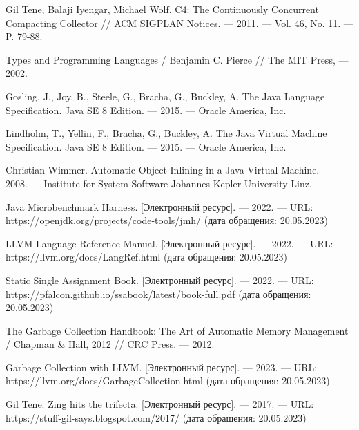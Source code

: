 \begingroup 
\renewcommand{\section}[2]{\anonsection{СПИСОК ИСПОЛЬЗОВАННЫХ ИСТОЧНИКОВ И ЛИТЕРАТУРЫ}}
\begin{flushleft}
\begin{thebibliography}{}

Gil Tene, Balaji Iyengar, Michael Wolf. C4: The Continuously Concurrent Compacting Collector
  // ACM SIGPLAN Notices. --- 2011. --- Vol. 46, No. 11. --- P. 79-88.

Types and Programming Languages / Benjamin C. Pierce // The MIT Press, --- 2002.

Gosling, J., Joy, B., Steele, G., Bracha, G., Buckley, A. The Java Language
Specification. Java SE 8 Edition. --- 2015. --- Oracle America, Inc.

Lindholm, T., Yellin, F., Bracha, G., Buckley, A. The Java Virtual Machine
Specification. Java SE 8 Edition. --- 2015. --- Oracle America, Inc.
	
Christian Wimmer. Automatic Object Inlining in a Java Virtual Machine. --- 2008. --- Institute for System Software
Johannes Kepler University Linz.

Java Microbenchmark Harness. [Электронный ресурс]. --- 2022. --- URL: https://openjdk.org/projects/code-tools/jmh/ (дата обращения: 20.05.2023)
	
LLVM Language Reference Manual. [Электронный ресурс]. --- 2022. --- URL: https://llvm.org/docs/LangRef.html  (дата обращения: 20.05.2023)
	
Static Single Assignment Book. [Электронный ресурс]. --- 2022. --- URL: https://pfalcon.github.io/ssabook/latest/book-full.pdf (дата обращения: 20.05.2023)
	
The Garbage Collection Handbook: The Art of Automatic Memory Management / Chapman \& Hall, 2012 // CRC Press. --- 2012.
	
Garbage Collection with LLVM. [Электронный ресурс]. --- 2023. --- URL: https://llvm.org/docs/GarbageCollection.html (дата обращения: 20.05.2023)
	
Gil Tene. Zing hits the trifecta. [Электронный ресурс]. --- 2017. --- URL: https://stuff-gil-says.blogspot.com/2017/ (дата обращения: 20.05.2023)


\end{thebibliography}
\end{flushleft}
